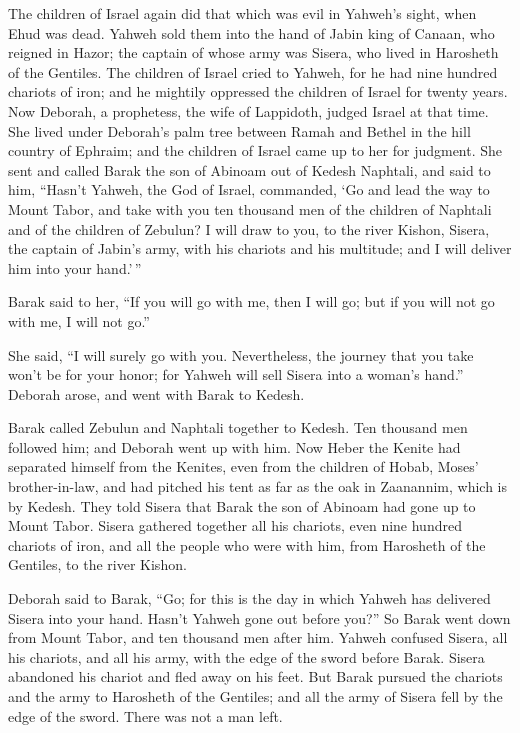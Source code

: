  The children of Israel again did that which was evil in
Yahweh's sight, when Ehud was dead.  Yahweh sold them into
the hand of Jabin king of Canaan, who reigned in Hazor; the captain of
whose army was Sisera, who lived in Harosheth of the Gentiles.
 The children of Israel cried to Yahweh, for he had nine
hundred chariots of iron; and he mightily oppressed the children of
Israel for twenty years.  Now Deborah, a prophetess, the
wife of Lappidoth, judged Israel at that time.  She lived
under Deborah's palm tree between Ramah and Bethel in the hill country
of Ephraim; and the children of Israel came up to her for judgment.
 She sent and called Barak the son of Abinoam out of
Kedesh Naphtali, and said to him, ``Hasn't Yahweh, the God of Israel,
commanded, `Go and lead the way to Mount Tabor, and take with you ten
thousand men of the children of Naphtali and of the children of Zebulun?
 I will draw to you, to the river Kishon, Sisera, the
captain of Jabin's army, with his chariots and his multitude; and I will
deliver him into your hand.'\,''

 Barak said to her, ``If you will go with me, then I will
go; but if you will not go with me, I will not go.''

 She said, ``I will surely go with you. Nevertheless, the
journey that you take won't be for your honor; for Yahweh will sell
Sisera into a woman's hand.'' Deborah arose, and went with Barak to
Kedesh.

 Barak called Zebulun and Naphtali together to Kedesh.
Ten thousand men followed him; and Deborah went up with him.
 Now Heber the Kenite had separated himself from the
Kenites, even from the children of Hobab, Moses' brother-in-law, and had
pitched his tent as far as the oak in Zaanannim, which is by Kedesh.
 They told Sisera that Barak the son of Abinoam had gone
up to Mount Tabor.  Sisera gathered together all his
chariots, even nine hundred chariots of iron, and all the people who
were with him, from Harosheth of the Gentiles, to the river Kishon.

 Deborah said to Barak, ``Go; for this is the day in
which Yahweh has delivered Sisera into your hand. Hasn't Yahweh gone out
before you?'' So Barak went down from Mount Tabor, and ten thousand men
after him.  Yahweh confused Sisera, all his chariots, and
all his army, with the edge of the sword before Barak. Sisera abandoned
his chariot and fled away on his feet.  But Barak pursued
the chariots and the army to Harosheth of the Gentiles; and all the army
of Sisera fell by the edge of the sword. There was not a man left.

